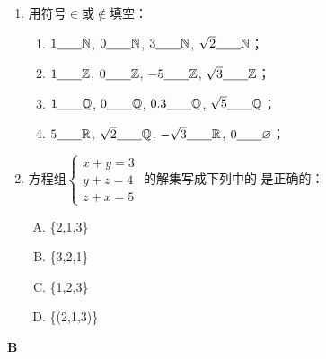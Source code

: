\begin{enumerate}
\item 用符号$\in$或$\notin$填空：
\begin{enumerate}[(1)]
    \item $1\underline{\qquad} \mathbb{N}$,\; $0\underline{\qquad}\mathbb{N}$,\; $3\underline{\qquad}\mathbb{N}$,\; $\sqrt{2}\underline{\qquad}\mathbb{N}$；
    \item $1\underline{\qquad} \mathbb{Z}$,\; $0\underline{\qquad}\mathbb{Z}$,\; $-5\underline{\qquad}\mathbb{Z}$,\; $\sqrt{3}\underline{\qquad}\mathbb{Z}$；
    \item $1\underline{\qquad} \mathbb{Q}$,\; $0\underline{\qquad}\mathbb{Q}$,\; $0.3\underline{\qquad}\mathbb{Q}$,\; $\sqrt{5}\underline{\qquad}\mathbb{Q}$；
    \item $5\underline{\qquad} \mathbb{R}$,\; $\sqrt{2}\underline{\qquad}\mathbb{Q}$,\; $-\sqrt{3}\underline{\qquad}\mathbb{R}$,\; $0\underline{\qquad}\varnothing$；
\end{enumerate}

\item 方程组$\begin{cases}
    x+y=3\\
  y+z=4  \\
  z+x=5
\end{cases}$
的解集写成下列中的\blank
是正确的：
\begin{multicols}{4}
\begin{enumerate}[(A)]
    \item \{2,1,3\}
    \item \{3,2,1\}
    \item \{1,2,3\}
    \item \{(2,1,3)\}
\end{enumerate}
\end{multicols}
\end{enumerate}

\begin{center}
    \bfseries B
\end{center}

